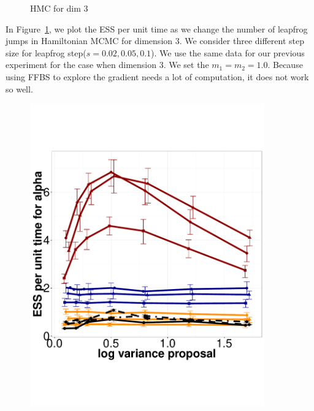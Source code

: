 \begin{figure}
\begin{minipage}[hp]{0.45\linewidth}
      \end{minipage}
    \caption{HMC for dim 3}
    \label{fig:HMC_DIM_3}
  \end{figure}
In Figure~\ref{fig:HMC_DIM_3}, we plot the ESS per unit time as we change the 
number of leapfrog jumps in Hamiltonian MCMC for dimension $3$. We consider 
three different step size for leapfrog step($s = 0.02, 0.05, 0.1$). We 
use the same data for our previous experiment for the case when dimension $3$. 
We set the $m_1 = m_2 = 1.0$. Because using FFBS to explore the gradient needs 
a lot of computation, it does not work so well.\\

  \begin{figure}%
  \centering
  \begin{minipage}[!hp]{0.45\linewidth}
  \centering
    \includegraphics [width=0.90\textwidth, angle=0]{figs/exp_5_alpha.pdf}
      \end{minipage}
  \begin{minipage}[hp]{0.45\linewidth}
  \centering

\end{minipage}
\end{figure}
